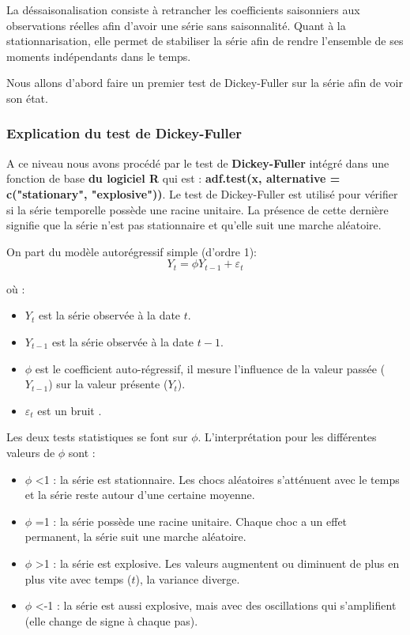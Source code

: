 \documentclass[
12pt,          %
a4paper,       %
oneside,       %
openright      %
]{report}
\begin{document}
 
 La déssaisonalisation consiste à retrancher les coefficients saisonniers aux observations réelles afin d'avoir une série sans saisonnalité. Quant à la stationnarisation, elle permet de stabiliser la série afin de rendre l'ensemble de ses moments indépendants dans le temps. 
 
 Nous allons d'abord faire un premier test de Dickey-Fuller sur la série afin de voir son état.
 
 \subsubsection{Explication du test de Dickey-Fuller}
 
 A ce niveau nous avons procédé par le test de \textbf{Dickey-Fuller} intégré dans une fonction de base \textbf{du logiciel R} qui est : \textbf{adf.test(x, alternative = c("stationary", "explosive"))}. 
Le test de Dickey-Fuller  est utilisé pour vérifier si la série temporelle possède une racine unitaire. La présence de cette dernière signifie que la série n’est pas stationnaire et qu’elle suit une marche aléatoire.

 On part du modèle autorégressif simple (d'ordre 1):
 \[
  Y_t = \phi Y_{t-1} + \varepsilon_t
 \]
 
où :\begin{itemize}
 \item $Y_t$ est la série observée à la date $t$.

  \item $Y_{t-1}$ est la série observée à la date $t-1$.
 
 \item $\phi$ est le coefficient auto-régressif, il mesure l'influence de la valeur passée ($Y_{t-1}$) sur la valeur présente ($Y_t$).
 
\item $\varepsilon_t$ est un bruit .

\end{itemize}


Les deux tests statistiques se font sur $\phi$. L'interprétation pour les différentes valeurs de $\phi$ sont : 
\begin{itemize}
\item $\phi$ <1 : la série est stationnaire. Les chocs aléatoires s’atténuent avec le temps et la série reste autour d’une certaine moyenne.

\item  $\phi$ =1 : la série possède une racine unitaire. Chaque choc a un effet permanent, la série suit une marche aléatoire.

\item  $\phi$ >1 : la série est explosive. Les valeurs augmentent ou diminuent de plus en plus vite avec temps ($t$), la variance diverge.

 \item  $\phi$ <-1 :  la série est aussi explosive, mais avec des oscillations qui s’amplifient (elle change de signe à chaque pas).
\end{itemize}
\end{document}
